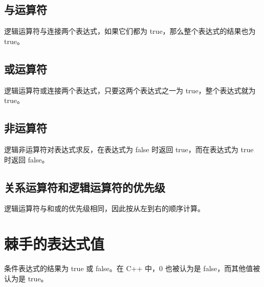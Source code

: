 \subsection*{与运算符}
逻辑运算符与连接两个表达式，如果它们都为 true，那么整个表达式的结果也为 true。
\subsection*{或运算符}
逻辑运算符或连接两个表达式，只要这两个表达式之一为 true，整个表达式就为 true。
\subsection*{非运算符}
逻辑非运算符对表达式求反，在表达式为 false 时返回 true，而在表达式为 true 时返回 false。
\subsection*{关系运算符和逻辑运算符的优先级}
逻辑运算符与和或的优先级相同，因此按从左到右的顺序计算。
\section{棘手的表达式值}
条件表达式的结果为 true 或 false。在 C++ 中，0 也被认为是 false，而其他值被认为是 true。